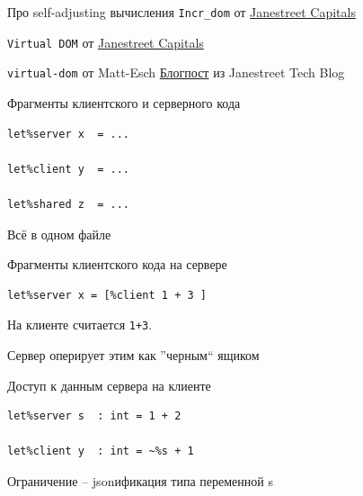 \documentclass{beamer}
\theoremstyle{definition}
\begin{document}
\begin{frame}[fragile]{Про self-adjusting вычисления}
\verb=Incr_dom= от     \href{https://www.janestreet.com/}{Janestreet Capitals} \href{https://github.com/janestreet/incr_dom}{\faGithub}

\verb=Virtual DOM=  от \href{https://www.janestreet.com/}{Janestreet Capitals} \href{https://github.com/janestreet/virtual_dom}{\faGithub}

\verb=virtual-dom= от Matt-Esch \href{https://github.com/Matt-Esch/virtual-dom}{\faGithub} 
\vskip5mm
\href{https://blog.janestreet.com/self-adjusting-dom/}{Блогпост} из Janestreet Tech Blog
\end{frame}

\begin{frame}[fragile]{Фрагменты клиентского и серверного кода}
\begin{verbatim}
let%server x  = ...

let%client y  = ...

let%shared z  = ...
\end{verbatim}
\vskip5mm
Всё в одном файле
\end{frame}

\begin{frame}[fragile]{Фрагменты клиентского кода на сервере}
\begin{verbatim}
let%server x = [%client 1 + 3 ]
\end{verbatim}

На клиенте считается \verb=1+3=.

Сервер оперирует этим как ''черным`` ящиком
\end{frame}

\begin{frame}[fragile]{Доступ к данным сервера на клиенте}
\begin{verbatim}
let%server s  : int = 1 + 2

let%client y  : int = ~%s + 1
\end{verbatim}
Ограничение -- jsonификация типа переменной s
\end{frame}
\end{document}
